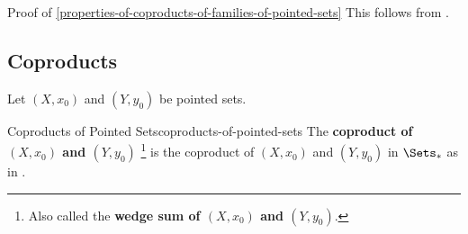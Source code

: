 \begin{Proof}{Proof of \cref{properties-of-coproducts-of-families-of-pointed-sets}}%
    This follows from .
\end{Proof}
\subsection{Coproducts}\label{subsection-coproducts-of-pointed-sets}
Let $(X,x_{0})$ and $(Y,y_{0})$ be pointed sets.
\begin{definition}{Coproducts of Pointed Sets}{coproducts-of-pointed-sets}%
    The \textbf{coproduct of $(X,x_{0})$ and $(Y,y_{0})$}%
    \footnote{%
        Also called the \textbf{wedge sum of $(X,x_{0})$ and $(Y,y_{0})$}.
        \par\vspace*{\TCBBoxCorrection}
    } %
    is the coproduct of $(X,x_{0})$ and $(Y,y_{0})$ in $\Sets_{*}$ as in .
\end{definition}
